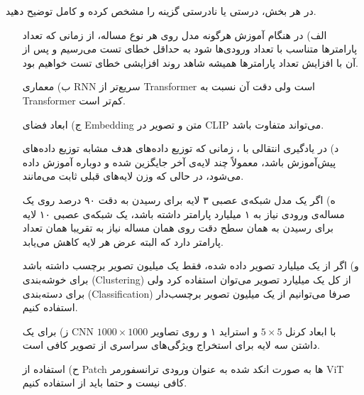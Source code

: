در هر بخش، درستی یا نادرستی گزینه را مشخص کرده و کامل توضیح دهید.
\begin{itemize}

    \item[الف)]
    در هنگام آموزش هرگونه مدل روی هر نوع مساله، از زمانی که تعداد پارامترها متناسب با تعداد ورودی‌ها شود به حداقل خطای تست می‌رسیم و پس از آن با افزایش تعداد پارامترها همیشه شاهد روند افزایشی خطای تست خواهیم بود.
    \item[ب)]
    معماری RNN سریع‌تر از Transformer است ولی دقت آن نسبت به Transformer کم‌تر است.

    \item[ج)]
    ابعاد فضای Embedding متن و تصویر در CLIP می‌تواند متفاوت باشد.
    
    \item[د)]
در یادگیری انتقالی با ، زمانی که توزیع داده‌های هدف مشابه توزیع داده‌های پیش‌آموزش باشد، معمولاً چند لایه‌ی  آخر جایگزین شده و دوباره آموزش داده می‌شود، در حالی که وزن لایه‌های قبلی ثابت می‌مانند.

\item[ه)]
اگر یک مدل شبکه‌ی عصبی ۳ لایه برای رسیدن به دقت ۹۰ درصد روی یک مساله‌ی ورودی نیاز به ۱ میلیارد پارامتر داشته باشد، یک شبکه‌ی عصبی ۱۰ لایه برای رسیدن به همان سطح دقت روی همان مساله نیاز به تقریبا همان تعداد پارامتر دارد که البته عرض هر لایه کاهش می‌یابد.

\item[و)]
اگر از یک میلیارد تصویر داده شده، فقط یک میلیون تصویر برچسب داشته باشد برای خوشه‌بندی (Clustering) از کل یک میلیارد تصویر می‌توان استفاده کرد ولی برای دسته‌بندی (Classification) صرفا می‌توانیم از یک میلیون تصویر برچسب‌دار استفاده کنیم.
\item[ز)]
برای یک CNN با ابعاد کرنل $5\times 5$ و استراید ۱ و روی تصاویر $1000\times 1000$ داشتن سه لایه برای استخراج ویژگی‌های سراسری از تصویر کافی است.
\item[ح)]
استفاده از Patch ها به صورت انکد شده به عنوان ورودی ترانسفورمر ViT کافی نیست و حتما باید از 
 استفاده کنیم.
\end{itemize}
